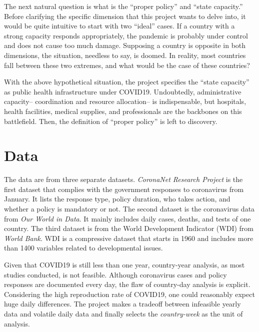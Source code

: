 \documentclass[12pt]{class}
\begin{document}
The next natural question is what is the “proper policy” and “state capacity.” Before clarifying the specific dimension that this project wants to delve into, it would be quite intuitive to start with two “ideal” cases. If a country with a strong capacity responds appropriately, the pandemic is probably under control and does not cause too much damage. Supposing a country is opposite in both dimensions, the situation, needless to say, is doomed. In reality, most countries fall between these two extremes, and what would be the case of these countries? \par 

With the above hypothetical situation, the project specifies the “state capacity” as public health infrastructure under COVID19. Undoubtedly, administrative capacity-- coordination and resource allocation-- is indispensable, but hospitals, health facilities, medical supplies, and professionals are the backbones on this battlefield. Then, the definition of “proper policy” is left to discovery. 


\section*{Data}
The data are from three separate datasets. \textit{CoronaNet Research Project} is the first dataset that complies with the government responses to coronavirus from January.\cite{crp} It lists the response type, policy duration, who takes action, and whether a policy is mandatory or not. The second dataset is the coronavirus data from \textit{Our World in Data}. It mainly includes daily cases, deaths, and tests of one country. The third dataset is from the World Development Indicator (WDI) from \textit{World Bank}. WDI is a compressive dataset that starts in 1960 and includes more than 1400 variables related to developmental issues. \par 

Given that COVID19 is still less than one year, country-year analysis, as most studies conducted, is not feasible. Although coronavirus cases and policy responses are documented every day, the flaw of country-day analysis is explicit. Considering the high reproduction rate of COVID19, one could reasonably expect huge daily differences. The project makes a tradeoff between infeasible yearly data and volatile daily data and finally selects the \textit{country-week} as the unit of analysis. \par 
\end{document}

